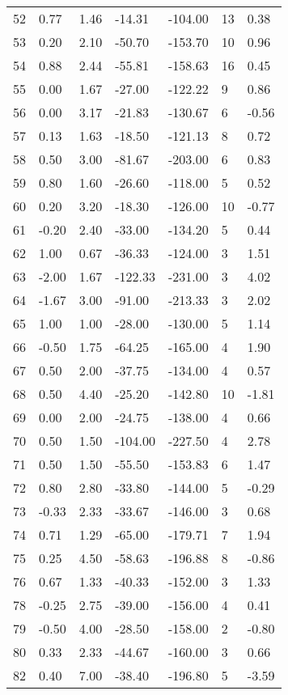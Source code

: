 \begin{appendices}
\begin{longtable}[c]{@{}lllllll@{}}
52 & 0.77 & 1.46 & -14.31 & -104.00 & 13 & 0.38 \\
53 & 0.20 & 2.10 & -50.70 & -153.70 & 10 & 0.96 \\
54 & 0.88 & 2.44 & -55.81 & -158.63 & 16 & 0.45 \\
55 & 0.00 & 1.67 & -27.00 & -122.22 & 9 & 0.86 \\
56 & 0.00 & 3.17 & -21.83 & -130.67 & 6 & -0.56 \\
57 & 0.13 & 1.63 & -18.50 & -121.13 & 8 & 0.72 \\
58 & 0.50 & 3.00 & -81.67 & -203.00 & 6 & 0.83 \\
59 & 0.80 & 1.60 & -26.60 & -118.00 & 5 & 0.52 \\
60 & 0.20 & 3.20 & -18.30 & -126.00 & 10 & -0.77 \\
61 & -0.20 & 2.40 & -33.00 & -134.20 & 5 & 0.44 \\
62 & 1.00 & 0.67 & -36.33 & -124.00 & 3 & 1.51 \\
63 & -2.00 & 1.67 & -122.33 & -231.00 & 3 & 4.02 \\
64 & -1.67 & 3.00 & -91.00 & -213.33 & 3 & 2.02 \\
65 & 1.00 & 1.00 & -28.00 & -130.00 & 5 & 1.14 \\
66 & -0.50 & 1.75 & -64.25 & -165.00 & 4 & 1.90 \\
67 & 0.50 & 2.00 & -37.75 & -134.00 & 4 & 0.57 \\
68 & 0.50 & 4.40 & -25.20 & -142.80 & 10 & -1.81 \\
69 & 0.00 & 2.00 & -24.75 & -138.00 & 4 & 0.66 \\
70 & 0.50 & 1.50 & -104.00 & -227.50 & 4 & 2.78 \\
71 & 0.50 & 1.50 & -55.50 & -153.83 & 6 & 1.47 \\
72 & 0.80 & 2.80 & -33.80 & -144.00 & 5 & -0.29 \\
73 & -0.33 & 2.33 & -33.67 & -146.00 & 3 & 0.68 \\
74 & 0.71 & 1.29 & -65.00 & -179.71 & 7 & 1.94 \\
75 & 0.25 & 4.50 & -58.63 & -196.88 & 8 & -0.86 \\
76 & 0.67 & 1.33 & -40.33 & -152.00 & 3 & 1.33 \\
78 & -0.25 & 2.75 & -39.00 & -156.00 & 4 & 0.41 \\
79 & -0.50 & 4.00 & -28.50 & -158.00 & 2 & -0.80 \\
80 & 0.33 & 2.33 & -44.67 & -160.00 & 3 & 0.66 \\
82 & 0.40 & 7.00 & -38.40 & -196.80 & 5 & -3.59 \\

\end{longtable}
\end{appendices}
